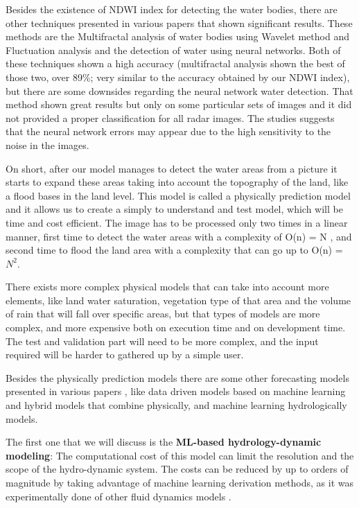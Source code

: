 \documentclass[12pt, a4paper]{report}
\begin{document}
Besides the existence of NDWI index for detecting the water bodies, there are other techniques presented in various papers \cite{Multifractal water analysis, NDWI Comparison} that shown significant results. These methods are the Multifractal analysis of water bodies using Wavelet method and Fluctuation analysis and the detection of water using neural networks. Both of these techniques shown a high accuracy (multifractal analysis shown the best of those two, over 89\%; very similar to the accuracy obtained by our NDWI index), but there are some downsides regarding the neural network water detection. That method shown great results but only on some particular sets of images and it did not provided a proper classification for all radar images. The studies \cite{NDWI Comparison} suggests that the neural network errors may appear due to the high sensitivity to the noise in the images. 
\par 

On short, after our model manages to detect the water areas from a picture it starts to expand these areas taking into account the topography of the land, like a flood bases in the land level. This model is called a physically prediction model and it allows us to create a simply to understand and test model, which will be time and cost efficient. The image has to be processed only two times in a linear manner, first time to detect the water areas with a complexity of O(n) = N , and second time to flood the land area with a complexity that can go up to O(n) = $N^2$. 
\par 

There exists more complex physical models that can take into account more elements, like land water saturation, vegetation type of that area and the volume of rain that will fall over specific areas, but that types of models are more complex, and more expensive both on execution time and on development time. The test and validation part will need to be more complex, and the input required will be harder to gathered up by a simple user. 
\par 

Besides the physically prediction models there are some other forecasting models presented in various papers \cite{Flood forecasting models}, like data driven models based on machine learning and hybrid models that combine physically, and machine learning hydrologically models.\par 

The first one that we will discuss is the \textbf{ML-based hydrology-dynamic modeling}: The computational cost of this model can limit the resolution and the scope of the hydro-dynamic system. The costs can be reduced by up to orders of magnitude by taking advantage of machine learning derivation methods, as it was experimentally done of other fluid dynamics models \cite{Yohai}.
\par 
\end{document}
